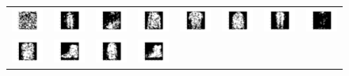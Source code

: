 \documentclass[12pt]{report}
\begin{document}
\begin{figure}[H]
\begin{tabular}{cccccccc}
  \includegraphics[width=0.1\linewidth]{qn2_i_0.png} &   \includegraphics[width=0.1\linewidth]{qn2_i_1.png} &
  \includegraphics[width=0.1\linewidth]{qn2_i_2.png} &   \includegraphics[width=0.1\linewidth]{qn2_i_3.png} &
  \includegraphics[width=0.1\linewidth]{qn2_i_4.png} &   \includegraphics[width=0.1\linewidth]{qn2_i_5.png} &
  \includegraphics[width=0.1\linewidth]{qn2_i_6.png} &   \includegraphics[width=0.1\linewidth]{qn2_i_7.png} \\
  \includegraphics[width=0.1\linewidth]{qn2_i_8.png} &   \includegraphics[width=0.1\linewidth]{qn2_i_9.png} &
  \includegraphics[width=0.1\linewidth]{qn2_i_10.png} &   \includegraphics[width=0.1\linewidth]{qn2_i_11.png} &

\end{tabular}
\end{figure}
\end{document}
